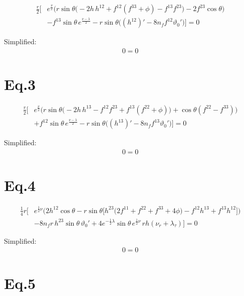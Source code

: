 \documentclass[12pt]{article}
\begin{document}
\begin{align*}
\frac{r}{2}\Big[
 & e^{\frac{\nu}{2}} \big(
   r \sin\theta \big(
     -2h\,h^{12}
     + f^{12}(f^{33} + \phi)
     - f^{13} f^{23}
   \big)
   - 2 f^{23} \cos\theta
 \big) \\
 &- f^{13} \sin\theta\, e^{\frac{\nu - \lambda}{2}}
 - r \sin\theta \big(
     (h^{12})' - 8n_f f^{12} \vartheta_0'
   \big)
\Big] = 0
\end{align*}

Simplified:
\begin{align*}
0 = 0
\end{align*}

\section*{Eq.3}

\begin{align*}
\frac{r}{2}\Big[
 & e^{\frac{\nu}{2}} \big(
   r \sin\theta \big(
     -2h\,h^{13}
     - f^{12} f^{23}
     + f^{13}(f^{22} + \phi)
   \big)
   + \cos\theta (f^{22} - f^{33})
 \big) \\
 &+ f^{12} \sin\theta\, e^{\frac{\nu - \lambda}{2}}
 - r \sin\theta \big(
     (h^{13})' - 8n_f f^{13} \vartheta_0'
   \big)
\Big] = 0
\end{align*}

Simplified:
\begin{align*}
  0 = 0
\end{align*}

\section*{Eq.4}

\begin{align*}
\frac{1}{4} r \Big[
 & e^{\frac{1}{2}\nu} \big(
   2h^{12}\cos\theta
   - r\sin\theta \big[
       h^{23}\big(2f^{11} + f^{22} + f^{33} + 4\phi\big)
       - f^{12}h^{13}
       + f^{13}h^{12}
     \big]
 \big) \\
 &- 8n_f r\, h^{23} \sin\theta\, \vartheta_0'
 + 4 e^{-\frac{1}{2}\lambda} \sin\theta\, e^{\frac{1}{2}\nu}\, r h
   (\nu_r + \lambda_\tau)
\Big] = 0
\end{align*}

Simplified:
\begin{align*}
  0 = 0
\end{align*}

\section*{Eq.5}
\end{document}
